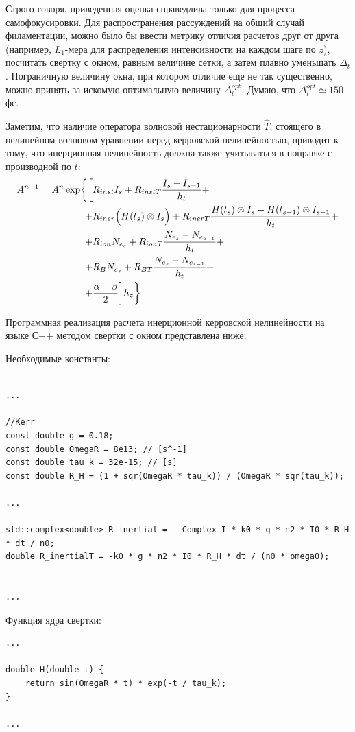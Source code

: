 \documentclass[a4paper]{article}
\begin{document}
Строго говоря, приведенная оценка справедлива только для процесса самофокусировки. Для распространения рассуждений на общий случай филаментации, можно было бы ввести метрику отличия расчетов друг от друга (например, $L_1$-мера для распределения интенсивности на каждом шаге по $z$), посчитать свертку с окном, равным величине сетки, а затем плавно уменьшать $\Delta_t$. Пограничную величину окна, при котором отличие еще не так существенно, можно принять за искомую оптимальную величину $\Delta_t^{opt}$. Думаю, что $\Delta_t^{opt} \simeq 150$ фс.

Заметим, что наличие оператора волновой нестационарности $\hat{T}$, стоящего в нелинейном волновом уравнении перед керровской нелинейностью, приводит к тому, что инерционная нелинейность должна также учитываться в поправке с производной по $t$:
\begin{equation}
\begin{aligned}
A^{n+1} = A^{n} \exp \biggl\{\biggl[
&R_{inst} I_{s} + R_{instT} \frac{I_{s} - I_{s-1}}{h_t} +\\
+&R_{iner} \Bigl( H(t_s) \otimes I_s \Bigr) + R_{inerT} \frac{ H(t_s) \otimes I_s - H(t_{s-1}) \otimes I_{s-1}}{h_t} +\\
+&R_{ion} N_{e_s} + R_{ionT} \frac{N_{e_s} - N_{e_{s-1}}}{h_t} +\\
+&R_{B} N_{e_s} + R_{BT} \frac{N_{e_s} - N_{e_{s-1}}}{h_t}+\\
+&\frac{\alpha + \beta}{2}
\biggr] h_z \biggr\}
\end{aligned}
\end{equation}

Программная реализация расчета инерционной керровской нелинейности на языке С++ методом свертки с окном представлена ниже.

\noindent Необходимые константы:
\begin{lstlisting}

...

//Kerr
const double g = 0.18;
const double OmegaR = 8e13; // [s^-1]
const double tau_k = 32e-15; // [s]
const double R_H = (1 + sqr(OmegaR * tau_k)) / (OmegaR * sqr(tau_k));

...

std::complex<double> R_inertial = -_Complex_I * k0 * g * n2 * I0 * R_H * dt / n0;
double R_inertialT = -k0 * g * n2 * I0 * R_H * dt / (n0 * omega0);


...

\end{lstlisting}

\noindent Функция ядра свертки:
\begin{lstlisting}
...

double H(double t) {
	return sin(OmegaR * t) * exp(-t / tau_k);
}

...
\end{lstlisting}
\end{document}
